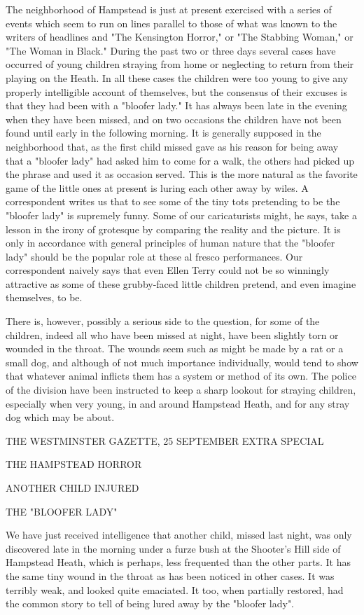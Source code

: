 The neighborhood of Hampstead is just at present exercised with a series of events which seem to run on lines parallel to those of what was known to the writers of headlines and "The Kensington Horror," or "The Stabbing Woman," or "The Woman in Black." During the past two or three days several cases have occurred of young children straying from home or neglecting to return from their playing on the Heath. In all these cases the children were too young to give any properly intelligible account of themselves, but the consensus of their excuses is that they had been with a "bloofer lady." It has always been late in the evening when they have been missed, and on two occasions the children have not been found until early in the following morning. It is generally supposed in the neighborhood that, as the first child missed gave as his reason for being away that a "bloofer lady" had asked him to come for a walk, the others had picked up the phrase and used it as occasion served. This is the more natural as the favorite game of the little ones at present is luring each other away by wiles. A correspondent writes us that to see some of the tiny tots pretending to be the "bloofer lady" is supremely funny. Some of our caricaturists might, he says, take a lesson in the irony of grotesque by comparing the reality and the picture. It is only in accordance with general principles of human nature that the "bloofer lady" should be the popular role at these al fresco performances. Our correspondent naively says that even Ellen Terry could not be so winningly attractive as some of these grubby-faced little children pretend, and even imagine themselves, to be. 

There is, however, possibly a serious side to the question, for some of the children, indeed all who have been missed at night, have been slightly torn or wounded in the throat. The wounds seem such as might be made by a rat or a small dog, and although of not much importance individually, would tend to show that whatever animal inflicts them has a system or method of its own. The police of the division have been instructed to keep a sharp lookout for straying children, especially when very young, in and around Hampstead Heath, and for any stray dog which may be about. 

THE WESTMINSTER GAZETTE, 25 SEPTEMBER EXTRA SPECIAL 

THE HAMPSTEAD HORROR 

ANOTHER CHILD INJURED 

THE "BLOOFER LADY" 

We have just received intelligence that another child, missed last night, was only discovered late in the morning under a furze bush at the Shooter's Hill side of Hampstead Heath, which is perhaps, less frequented than the other parts. It has the same tiny wound in the throat as has been noticed in other cases. It was terribly weak, and looked quite emaciated. It too, when partially restored, had the common story to tell of being lured away by the "bloofer lady". 

